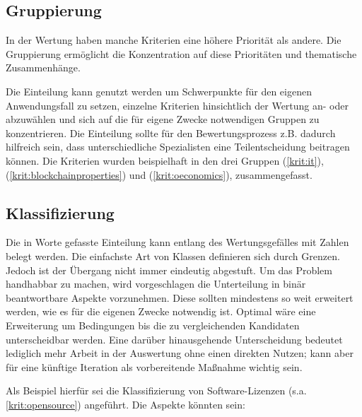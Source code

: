 \subsection{Gruppierung}

In der Wertung haben manche Kriterien eine höhere Priorität als andere.
Die Gruppierung ermöglicht die Konzentration auf diese Prioritäten und thematische Zusammenhänge.

Die Einteilung kann genutzt werden um Schwerpunkte für den eigenen Anwendungsfall zu setzen,
einzelne Kriterien hinsichtlich der Wertung an- oder abzuwählen und sich auf die für eigene Zwecke notwendigen Gruppen zu konzentrieren.
Die Einteilung sollte für den Bewertungsprozess z.B. dadurch hilfreich sein, dass unterschiedliche Spezialisten eine Teilentscheidung beitragen können.
Die Kriterien wurden beispielhaft in den drei Gruppen  (\ref{krit:it}),  (\ref{krit:blockchainproperties}) und  (\ref{krit:oeconomics}), zusammengefasst.

\subsection{Klassifizierung}\label{classification}

Die in Worte gefasste Einteilung kann entlang des Wertungsgefälles mit Zahlen belegt werden.
Die einfachste Art von Klassen definieren sich durch Grenzen.
Jedoch ist der Übergang nicht immer eindeutig abgestuft.
Um das Problem handhabbar zu machen, wird vorgeschlagen die Unterteilung in binär beantwortbare Aspekte vorzunehmen.
Diese sollten mindestens so weit erweitert werden, wie es für die eigenen Zwecke notwendig ist.
Optimal wäre eine Erweiterung um Bedingungen bis die zu vergleichenden Kandidaten unterscheidbar werden.
Eine darüber hinausgehende Unterscheidung bedeutet lediglich mehr Arbeit in der Auswertung ohne einen direkten Nutzen; kann aber für eine künftige Iteration als vorbereitende Maßnahme wichtig sein.

Als Beispiel hierfür sei die Klassifizierung von Software-Lizenzen (s.a. \ref{krit:opensource}) angeführt.
Die Aspekte könnten sein:



